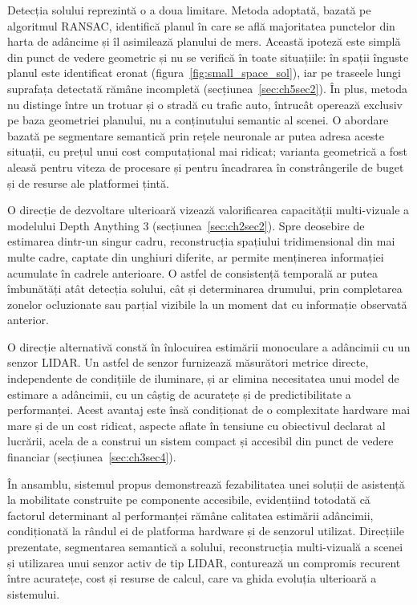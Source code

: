 Detecția solului reprezintă o a doua limitare. Metoda adoptată, bazată pe algoritmul RANSAC, identifică planul în care se află majoritatea punctelor din harta de adâncime și îl asimilează planului de mers. Această ipoteză este simplă din punct de vedere geometric și nu se verifică în toate situațiile: în spații înguste planul este identificat eronat (figura~\ref{fig:small_space_sol}), iar pe traseele lungi suprafața detectată rămâne incompletă (secțiunea~\ref{sec:ch5sec2}). În plus, metoda nu distinge între un trotuar și o stradă cu trafic auto, întrucât operează exclusiv pe baza geometriei planului, nu a conținutului semantic al scenei. O abordare bazată pe segmentare semantică prin rețele neuronale ar putea adresa aceste situații, cu prețul unui cost computațional mai ridicat; varianta geometrică a fost aleasă pentru viteza de procesare și pentru încadrarea în constrângerile de buget și de resurse ale platformei țintă.

O direcție de dezvoltare ulterioară vizează valorificarea capacității multi-vizuale a modelului Depth Anything 3 (secțiunea~\ref{sec:ch2sec2}). Spre deosebire de estimarea dintr-un singur cadru, reconstrucția spațiului tridimensional din mai multe cadre, captate din unghiuri diferite, ar permite menținerea informației acumulate în cadrele anterioare. O astfel de consistență temporală ar putea îmbunătăți atât detecția solului, cât și determinarea drumului, prin completarea zonelor ocluzionate sau parțial vizibile la un moment dat cu informație observată anterior.

O direcție alternativă constă în înlocuirea estimării monoculare a adâncimii cu un senzor LIDAR. Un astfel de senzor furnizează măsurători metrice directe, independente de condițiile de iluminare, și ar elimina necesitatea unui model de estimare a adâncimii, cu un câștig de acuratețe și de predictibilitate a performanței. Acest avantaj este însă condiționat de o complexitate hardware mai mare și de un cost ridicat, aspecte aflate în tensiune cu obiectivul declarat al lucrării, acela de a construi un sistem compact și accesibil din punct de vedere financiar (secțiunea~\ref{sec:ch3sec4}).

În ansamblu, sistemul propus demonstrează fezabilitatea unei soluții de asistență la mobilitate construite pe componente accesibile, evidențiind totodată că factorul determinant al performanței rămâne calitatea estimării adâncimii, condiționată la rândul ei de platforma hardware și de senzorul utilizat. Direcțiile prezentate, segmentarea semantică a solului, reconstrucția multi-vizuală a scenei și utilizarea unui senzor activ de tip LIDAR, conturează un compromis recurent între acuratețe, cost și resurse de calcul, care va ghida evoluția ulterioară a sistemului.
